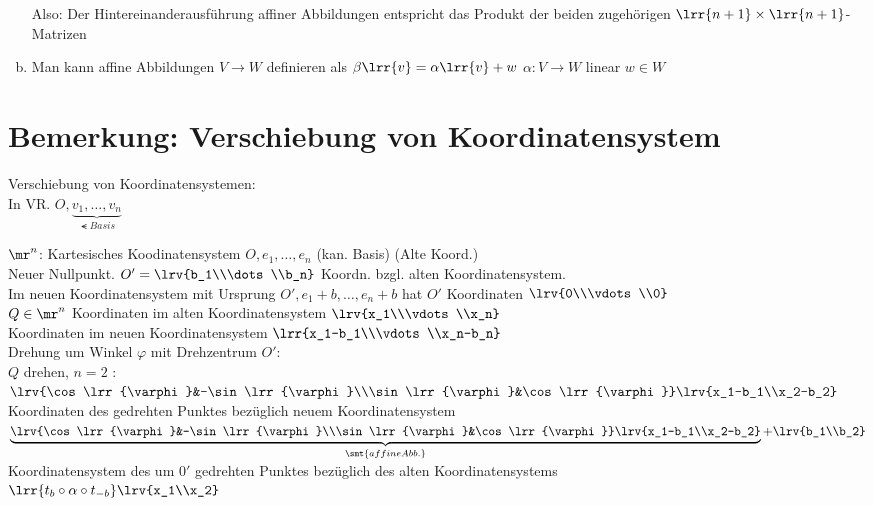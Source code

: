 \begin{enumerate}[a)]
			Also: Der Hintereinanderausführung affiner Abbildungen entspricht das Produkt der beiden zugehörigen $\lrr{n+1}\times\lrr{n+1}$-Matrizen
		\item Man kann affine Abbildungen $V\rightarrow W$ definieren als $\beta\lrr{v}=\alpha\lrr{v}+w$ $\alpha:V\rightarrow W$ linear $w\in W$
	\end{enumerate}
	
\section{Bemerkung: Verschiebung von Koordinatensystem}
	Verschiebung von Koordinatensystemen:\\
	In VR. $O,\underbrace{v_1,\dots,v_n}_{\smt{Basis}}$
	
	
	$\mr^n$: Kartesisches Koodinatensystem $O,e_1,\dots,e_n$ (kan. Basis) (Alte Koord.)\\
	Neuer Nullpunkt. $O'=\lrv{b_1\\\dots\\b_n}$ Koordn. bzgl. alten Koordinatensystem.\\
	Im neuen Koordinatensystem mit Ursprung $O',e_1+b,\dots,e_n+b$ hat $O'$ Koordinaten $\lrv{0\\\vdots\\0}$\\
	$Q\in\mr^n$ Koordinaten im alten Koordinatensystem $\lrv{x_1\\\vdots\\x_n}$\\
	Koordinaten im neuen Koordinatensystem $\lrr{x_1-b_1\\\vdots\\x_n-b_n}$\\
	Drehung um Winkel $\varphi$ mit Drehzentrum $O'$:\\
	$Q$ drehen, $n=2$ : $\lrv{\cos\lrr{\varphi}&-\sin\lrr{\varphi}\\\sin\lrr{\varphi}&\cos\lrr{\varphi}}\lrv{x_1-b_1\\x_2-b_2}$ Koordinaten des gedrehten Punktes bezüglich neuem Koordinatensystem\\
	$\underbrace{\lrv{\cos\lrr{\varphi}&-\sin\lrr{\varphi}\\\sin\lrr{\varphi}&\cos\lrr{\varphi}}\lrv{x_1-b_1\\x_2-b_2}}_{\smt{affine Abb.}}+\lrv{b_1\\b_2}$\\
	Koordinatensystem des um $0'$ gedrehten Punktes bezüglich des alten Koordinatensystems\\
	$\lrr{t_b\circ\alpha\circ t_{-b}}\lrv{x_1\\x_2}$
